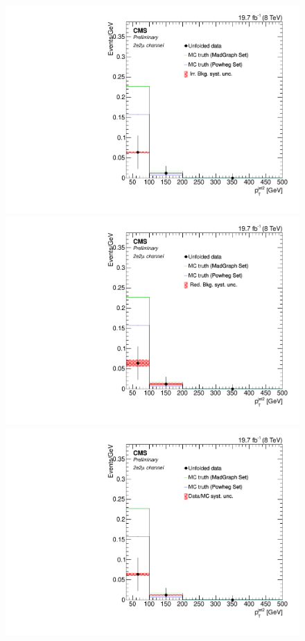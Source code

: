 \begin{figure}[hbtp]
\begin{center}
   \includegraphics[width=0.8\cmsFigWidth]{Figures/Unfolding/Systematics/ZZTo2e2m_PtJet2_IrrBkg_Mad_fr}
   \includegraphics[width=0.8\cmsFigWidth]{Figures/Unfolding/Systematics/ZZTo2e2m_PtJet2_RedBkg_Mad_fr}     
   \includegraphics[width=0.8\cmsFigWidth]{Figures/Unfolding/Systematics/ZZTo2e2m_PtJet2_UnfDataOverGenMC_Mad_fr}     

\end{center}
\end{figure}
